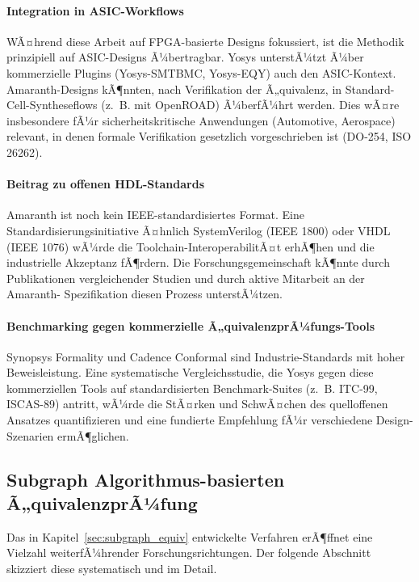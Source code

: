 ﻿\documentclass[12pt,a4paper]{report}
\begin{document}
\paragraph{Integration in ASIC-Workflows}
WÃ¤hrend diese Arbeit auf FPGA-basierte Designs fokussiert, ist die Methodik prinzipiell
auf ASIC-Designs Ã¼bertragbar. Yosys unterstÃ¼tzt Ã¼ber kommerzielle Plugins
(Yosys-SMTBMC, Yosys-EQY) auch den ASIC-Kontext. Amaranth-Designs kÃ¶nnten, nach
Verifikation der Ã„quivalenz, in Standard-Cell-Syntheseflows (z.~B. mit OpenROAD) 
Ã¼berfÃ¼hrt werden. Dies wÃ¤re insbesondere fÃ¼r sicherheitskritische Anwendungen
(Automotive, Aerospace) relevant, in denen formale Verifikation gesetzlich
vorgeschrieben ist (DO-254, ISO 26262).

\paragraph{Beitrag zu offenen HDL-Standards}
Amaranth ist noch kein IEEE-standardisiertes Format. Eine Standardisierungsinitiative
Ã¤hnlich SystemVerilog (IEEE 1800) oder VHDL (IEEE 1076) wÃ¼rde die Toolchain-InteroperabilitÃ¤t
erhÃ¶hen und die industrielle Akzeptanz fÃ¶rdern. Die Forschungsgemeinschaft kÃ¶nnte durch
Publikationen vergleichender Studien und durch aktive Mitarbeit an der Amaranth-
Spezifikation diesen Prozess unterstÃ¼tzen.

\paragraph{Benchmarking gegen kommerzielle Ã„quivalenzprÃ¼fungs-Tools}
Synopsys Formality und Cadence Conformal sind Industrie-Standards mit hoher
Beweisleistung. Eine systematische Vergleichsstudie, die Yosys gegen diese kommerziellen
Tools auf standardisierten Benchmark-Suites (z.~B. ITC-99, ISCAS-89) antritt, wÃ¼rde
die StÃ¤rken und SchwÃ¤chen des quelloffenen Ansatzes quantifizieren und eine fundierte
Empfehlung fÃ¼r verschiedene Design-Szenarien ermÃ¶glichen.

\subsection{Subgraph Algorithmus-basierten Ã„quivalenzprÃ¼fung}

Das in Kapitel~\ref{sec:subgraph_equiv} entwickelte Verfahren erÃ¶ffnet eine Vielzahl
weiterfÃ¼hrender Forschungsrichtungen. Der folgende Abschnitt skizziert diese
systematisch und im Detail.
\end{document}
